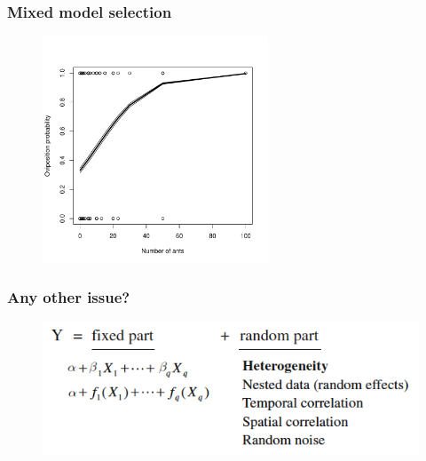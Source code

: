 \documentclass[10pt]{beamer}
\begin{document}

\begin{frame}[fragile]
\frametitle{Mixed model selection}


\begin{figure}
\includegraphics[width=0.6\textwidth]{pictures/Rplot-representation.pdf}
\end{figure}

\end{frame}




\begin{frame}[fragile]
\frametitle{Any other issue?}

\begin{figure}
\includegraphics[width=1\textwidth]{pictures/otherissues}
\end{figure}

\end{frame}
\end{document}
